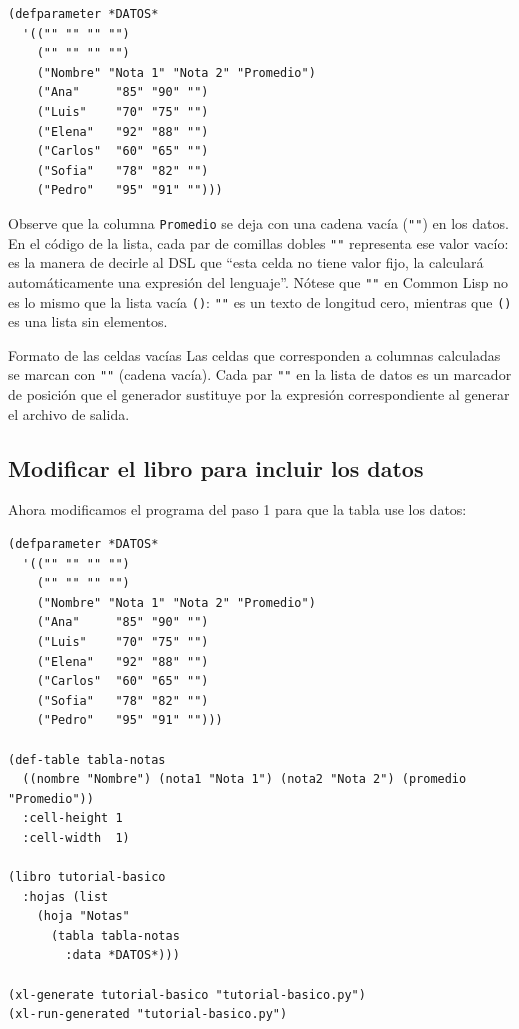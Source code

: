 \documentclass[12pt,a4paper]{report}
\begin{document}
\begin{lstlisting}[caption={Datos de entrada.}]
(defparameter *DATOS*
  '(("" "" "" "")
    ("" "" "" "")
    ("Nombre" "Nota 1" "Nota 2" "Promedio")
    ("Ana"     "85" "90" "")
    ("Luis"    "70" "75" "")
    ("Elena"   "92" "88" "")
    ("Carlos"  "60" "65" "")
    ("Sofia"   "78" "82" "")
    ("Pedro"   "95" "91" "")))
\end{lstlisting}

Observe que la columna \texttt{Promedio} se deja con una cadena vacía
(\texttt{""}) en los datos.  En el código de la lista, cada par de
comillas dobles \texttt{""} representa ese valor vacío: es la manera de
decirle al DSL que ``esta celda no tiene valor fijo, la calculará
automáticamente una expresión del lenguaje''.  Nótese que \texttt{""} en Common Lisp
no es lo mismo que la lista vacía \texttt{()}: \texttt{""} es un texto
de longitud cero, mientras que \texttt{()} es una lista sin elementos.

\begin{advertencia}{Formato de las celdas vacías}
  Las celdas que corresponden a columnas calculadas se marcan con
  \texttt{""} (cadena vacía).  Cada par \texttt{""} en la lista de datos
  es un marcador de posición que el generador sustituye por la expresión
  correspondiente al generar el archivo de salida.
\end{advertencia}

\subsection{Modificar el libro para incluir los datos}

Ahora modificamos el programa del paso 1 para que la tabla use los
datos:

\begin{lstlisting}[caption={Paso 2: libro con datos.}]
(defparameter *DATOS*
  '(("" "" "" "")
    ("" "" "" "")
    ("Nombre" "Nota 1" "Nota 2" "Promedio")
    ("Ana"     "85" "90" "")
    ("Luis"    "70" "75" "")
    ("Elena"   "92" "88" "")
    ("Carlos"  "60" "65" "")
    ("Sofia"   "78" "82" "")
    ("Pedro"   "95" "91" "")))

(def-table tabla-notas
  ((nombre "Nombre") (nota1 "Nota 1") (nota2 "Nota 2") (promedio "Promedio"))
  :cell-height 1
  :cell-width  1)

(libro tutorial-basico
  :hojas (list
    (hoja "Notas"
      (tabla tabla-notas
        :data *DATOS*)))

(xl-generate tutorial-basico "tutorial-basico.py")
(xl-run-generated "tutorial-basico.py")
\end{lstlisting}
\end{document}

